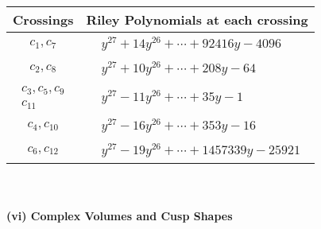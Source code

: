 \documentclass[1p]{elsarticle_modified}
\theoremstyle{definition}
\begin{document}
\begin{tabular}{m{50pt}|m{274pt}}
Crossings & \hspace{64pt}Riley Polynomials at each crossing \\
\hline $$\begin{aligned}c_{1},c_{7}\end{aligned}$$&$\begin{aligned}
&y^{27}+14 y^{26}+\cdots+92416 y-4096
\end{aligned}$\\
\hline $$\begin{aligned}c_{2},c_{8}\end{aligned}$$&$\begin{aligned}
&y^{27}+10 y^{26}+\cdots+208 y-64
\end{aligned}$\\
\hline $$\begin{aligned}c_{3},c_{5},c_{9}\\c_{11}\end{aligned}$$&$\begin{aligned}
&y^{27}-11 y^{26}+\cdots+35 y-1
\end{aligned}$\\
\hline $$\begin{aligned}c_{4},c_{10}\end{aligned}$$&$\begin{aligned}
&y^{27}-16 y^{26}+\cdots+353 y-16
\end{aligned}$\\
\hline $$\begin{aligned}c_{6},c_{12}\end{aligned}$$&$\begin{aligned}
&y^{27}-19 y^{26}+\cdots+1457339 y-25921
\end{aligned}$\\
\hline
\end{tabular}\\~\\
\newpage\flushleft \textbf{(vi) Complex Volumes and Cusp Shapes}
\end{document}
